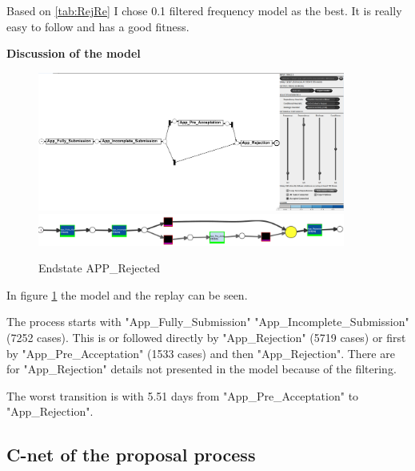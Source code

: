 Based on \ref{tab:RejRe} I chose 0.1 filtered frequency model as the best. It is really easy to follow and has a good fitness.

\textbf{Discussion of the model}

\begin{figure}[!htbp]
\centering
\includegraphics[width=0.9\textwidth]{Rej0-1.PNG}
\includegraphics[width=0.9\textwidth]{RejReplay.PNG}
\caption{Endstate APP\_Rejected}
\label{fig:RejModel}
\end{figure}

In figure \ref{fig:RejModel} the model and the replay can be seen. 

The process starts with "App\_Fully\_Submission" \textrightarrow "App\_Incomplete\_Submission" (7252 cases). This is or followed directly by "App\_Rejection" (5719 cases) or first by "App\_Pre\_Acceptation" (1533 cases) and then "App\_Rejection". There are for "App\_Rejection" details not presented in the model because of the filtering.

The worst transition is with 5.51 days from "App\_Pre\_Acceptation" to "App\_Rejection".

\subsection{C-net of the proposal process}

